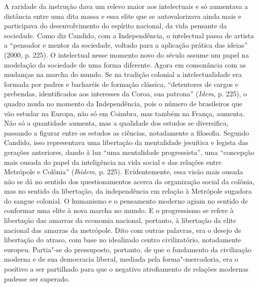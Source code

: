 A raridade da instrução dava um relevo maior aos intelectuais e só
aumentava a distância entre uma dita massa e essa elite que se
autovalorizava ainda mais e participava do desenvolvimento do espírito
nacional, da vida pensante da sociedade. Como diz Candido, com a
Independência, o intelectual passa de artista a ``pensador e mentor da
sociedade, voltado para a aplicação prática das ideias'' (2000, p.
225). O intelectual nesse momento novo do século  assume um
papel na modelação da sociedade de uma forma diferente. Agora em
consonância com as mudanças na marcha do mundo. Se na tradição colonial
a intelectualidade era formada por padres e bacharéis de formação
clássica, ``detentores de cargos e prebendas, identificados aos
interesses da Coroa, sua patrona'' (\emph{Idem}, p. 225), o quadro muda
no momento da Independência, pois o número de brasileiros que vão
estudar na Europa, não só em Coimbra, mas também na França, aumenta. Não
só a quantidade aumenta, mas a qualidade dos estudos se diversifica,
passando a figurar entre os estudos as ciências, notadamente a
filosofia. Segundo Candido, isso representava uma libertação da
mentalidade jesuítica e legista das gerações anteriores, dando à luz
``uma mentalidade progressista'', uma ``concepção mais ousada do papel
da inteligência na vida social e das relações entre Metrópole e
Colônia'' (\emph{Ibidem}, p. 225). Evidentemente, essa visão mais ousada
não se dá no sentido dos questionamentos acerca da organização social da
colônia, mas no sentido da libertação, da independência em relação à
Metrópole sugadora do sangue colonial. O humanismo e o pensamento
moderno agiam no sentido de conformar uma elite à nova marcha no mundo.
E o progressismo se refere à libertação das amarras da economia
nacional, portanto, à libertação da elite nacional das amarras da
metrópole. Dito com outras palavras, era o desejo de libertação do
atraso, com base no idealizado centro civilizatório, notadamente
europeu. Partia"-se do pressuposto, portanto, de que o fundamento da
civilização moderna e de sua democracia liberal, mediada pela
forma"-mercadoria, era o positivo a ser partilhado para que o negativo
atrofiamento de relações modernas pudesse ser superado.

